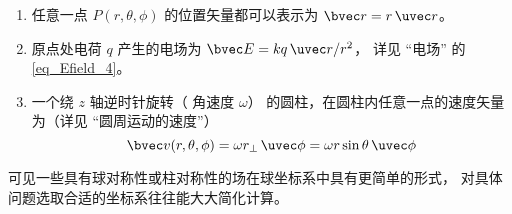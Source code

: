 \begin{example}{}
\begin{enumerate}
\item 任意一点 $P(r, \theta, \phi)$ 的位置矢量都可以表示为 $\bvec r = r\,\uvec r$。
\item 原点处电荷 $q$ 产生的电场为 $\bvec E = k q \,\uvec r/r^2$， 详见 “电场” 的\autoref{eq_Efield_4}。
\item 一个绕 $z$ 轴逆时针旋转（ 角速度 $\omega $） 的圆柱，在圆柱内任意一点的速度矢量为（详见 “圆周运动的速度”）
\begin{equation}
\bvec v(r, \theta, \phi) = \omega r_\bot \,\uvec \phi = \omega r\sin \theta \,\uvec \phi 
\end{equation}
\end{enumerate}
可见一些具有球对称性或柱对称性的场在球坐标系中具有更简单的形式， 对具体问题选取合适的坐标系往往能大大简化计算。
\end{example}
